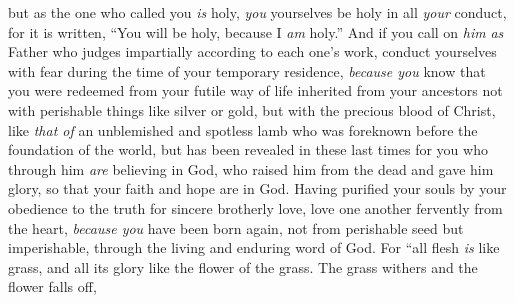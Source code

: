 \begin{biblechapter}
\verse but as the one who called you \textit{is} holy, \textit{you} yourselves be holy in all \textit{your} conduct,
\verse for it is written, “You will be holy, because I \textit{am} holy.”
\verse And if you call on \textit{him} \textit{as} Father who judges impartially according to each one’s work, conduct yourselves with fear during the time of your temporary residence,
\verse \textit{because you} know that you were redeemed from your futile way of life inherited from your ancestors not with perishable things like silver or gold,
\verse but with the precious blood of Christ, like \textit{that of} an unblemished and spotless lamb
\verse who was foreknown before the foundation of the world, but has been revealed in these last times for you
\verse who through him \textit{are} believing in God, who raised him from the dead and gave him glory, so that your faith and hope are in God.
\verse Having purified your souls by your obedience to the truth for sincere brotherly love, love one another fervently from the heart,
\verse \textit{because you} have been born again, not from perishable seed but imperishable, through the living and enduring word of God.
\verse For
\verse “all flesh \textit{is} like grass, 
and all its glory like the flower of the grass. 
The grass withers and the flower falls off,
\end{biblechapter}

